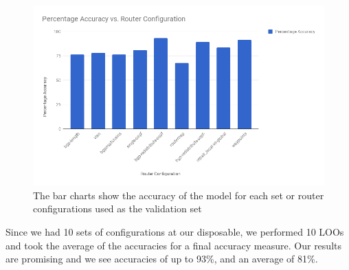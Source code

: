 \begin{figure}[H]
	\centering
	\includegraphics[width=4.5in]{model_analysis.png}
	\caption{The bar charts show the accuracy of the model for each set or router configurations used as the validation set}
\end{figure}
Since we had 10 sets of configurations at our disposable, we performed 10 LOOs and took the average of the accuracies for a final accuracy measure. Our results are promising and we see accuracies of up to 93\%, and an average of 81\%.
